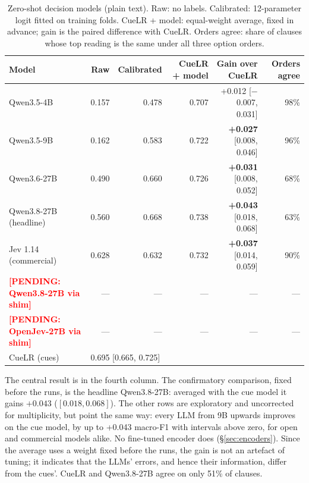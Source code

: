 \documentclass[11pt]{article}
\newcommand{\pending}[1]{\textcolor{red}{\textbf{[PENDING: #1]}}}
\begin{document}
\begin{table}[t]
\centering\small
\begin{tabular}{lrrrrr}
\toprule
Model & Raw & Calibrated & CueLR + model & Gain over CueLR & Orders agree \\
\midrule
Qwen3.5-4B & 0.157 & 0.478 & 0.707 & +0.012 [$-$0.007, 0.031] & 98\% \\
Qwen3.5-9B & 0.162 & 0.583 & 0.722 & \textbf{+0.027} [0.008, 0.046] & 96\% \\
Qwen3.6-27B & 0.490 & 0.660 & 0.726 & \textbf{+0.031} [0.008, 0.052] & 68\% \\
Qwen3.8-27B (headline) & 0.560 & 0.668 & 0.738 & \textbf{+0.043} [0.018, 0.068] & 63\% \\
Jev 1.14 (commercial) & 0.628 & 0.632 & 0.732 & \textbf{+0.037} [0.014, 0.059] & 90\% \\
\pending{Qwen3.8-27B via shim} & --- & --- & --- & --- & --- \\
\pending{OpenJev-27B via shim} & --- & --- & --- & --- & --- \\
\midrule
CueLR (cues) & \multicolumn{5}{l}{0.695 [0.665, 0.725]} \\
\bottomrule
\end{tabular}
\caption{Zero-shot decision models (plain text). Raw: no labels. Calibrated: 12-parameter logit fitted on training folds. CueLR + model: equal-weight average, fixed in advance; gain is the paired difference with CueLR. Orders agree: share of clauses whose top reading is the same under all three option orders.}
\label{tab:llm}
\end{table}

The central result is in the fourth column. The confirmatory comparison, fixed before the runs, is the headline Qwen3.8-27B: averaged with the cue model it gains $+0.043$ ($[0.018, 0.068]$). The other rows are exploratory and uncorrected for multiplicity, but point the same way: every LLM from 9B upwards improves on the cue model, by up to +0.043 macro-F1 with intervals above zero, for open and commercial models alike. No fine-tuned encoder does (\S\ref{sec:encoders}). Since the average uses a weight fixed before the runs, the gain is not an artefact of tuning; it indicates that the LLMs' errors, and hence their information, differ from the cues'. CueLR and Qwen3.8-27B agree on only 51\% of clauses.
\end{document}
